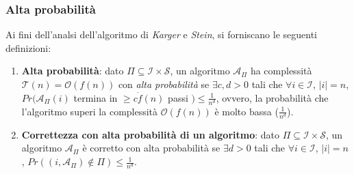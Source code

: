 \subsubsection*{Alta probabilità}

Ai fini dell'analsi dell'algoritmo di \textit{Karger} e \textit{Stein}, si forniscano le seguenti definizioni:
\begin{enumerate}
    \item \textbf{Alta probabilità}: dato $\Pi \subseteq \mathcal{I} \times \mathcal{S}$, un algoritmo $\mathcal{A}_{\Pi}$ 
    ha complessità $\mathcal{T}(n) = \mathcal{O}(f(n))$ con \textit{alta probabilità} se $\exists c, d > 0$ tali che 
    $\forall i \in \mathcal{I}$, $|i| = n$, $Pr(\mathcal{A}_{\Pi}(i)$ termina in $\ge c \dot f(n)$ passi $) \le \frac{1}{n^d}$, 
    ovvero, la probabilità che l'algoritmo superi la complessità $\mathcal{O}(f(n))$ è molto bassa ($\frac{1}{n^d}$).
    \item \textbf{Correttezza con alta probabilità di un algoritmo}: dato $\Pi \subseteq \mathcal{I} \times \mathcal{S}$, 
    un algoritmo $\mathcal{A}_{\Pi}$ è corretto con alta probabilità se $\exists d > 0$ tali che 
    $\forall i \in \mathcal{I}$, $|i| = n$, $Pr((i, \mathcal{A}_{\Pi}) \notin \Pi) \le \frac{1}{n^d}$.
\end{enumerate}